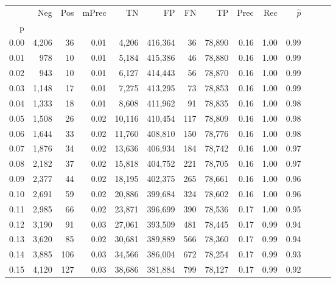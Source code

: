 \begin{tabular}{rrrrrrrrrrrrrr}
\toprule
{} &     Neg &    Pos & mPrec &       TN &       FP &      FN &      TP &  Prec &   Rec & $\hat{p}$ \\
p    &         &        &       &          &          &         &         &       &       &           \\
\midrule
0.00 &   4,206 &     36 &  0.01 &    4,206 &  416,364 &      36 &  78,890 &  0.16 &  1.00 &      0.99 \\
0.01 &     978 &     10 &  0.01 &    5,184 &  415,386 &      46 &  78,880 &  0.16 &  1.00 &      0.99 \\
0.02 &     943 &     10 &  0.01 &    6,127 &  414,443 &      56 &  78,870 &  0.16 &  1.00 &      0.99 \\
0.03 &   1,148 &     17 &  0.01 &    7,275 &  413,295 &      73 &  78,853 &  0.16 &  1.00 &      0.99 \\
0.04 &   1,333 &     18 &  0.01 &    8,608 &  411,962 &      91 &  78,835 &  0.16 &  1.00 &      0.98 \\
0.05 &   1,508 &     26 &  0.02 &   10,116 &  410,454 &     117 &  78,809 &  0.16 &  1.00 &      0.98 \\
0.06 &   1,644 &     33 &  0.02 &   11,760 &  408,810 &     150 &  78,776 &  0.16 &  1.00 &      0.98 \\
0.07 &   1,876 &     34 &  0.02 &   13,636 &  406,934 &     184 &  78,742 &  0.16 &  1.00 &      0.97 \\
0.08 &   2,182 &     37 &  0.02 &   15,818 &  404,752 &     221 &  78,705 &  0.16 &  1.00 &      0.97 \\
0.09 &   2,377 &     44 &  0.02 &   18,195 &  402,375 &     265 &  78,661 &  0.16 &  1.00 &      0.96 \\
0.10 &   2,691 &     59 &  0.02 &   20,886 &  399,684 &     324 &  78,602 &  0.16 &  1.00 &      0.96 \\
0.11 &   2,985 &     66 &  0.02 &   23,871 &  396,699 &     390 &  78,536 &  0.17 &  1.00 &      0.95 \\
0.12 &   3,190 &     91 &  0.03 &   27,061 &  393,509 &     481 &  78,445 &  0.17 &  0.99 &      0.94 \\
0.13 &   3,620 &     85 &  0.02 &   30,681 &  389,889 &     566 &  78,360 &  0.17 &  0.99 &      0.94 \\
0.14 &   3,885 &    106 &  0.03 &   34,566 &  386,004 &     672 &  78,254 &  0.17 &  0.99 &      0.93 \\
0.15 &   4,120 &    127 &  0.03 &   38,686 &  381,884 &     799 &  78,127 &  0.17 &  0.99 &      0.92 \\

\end{tabular}
